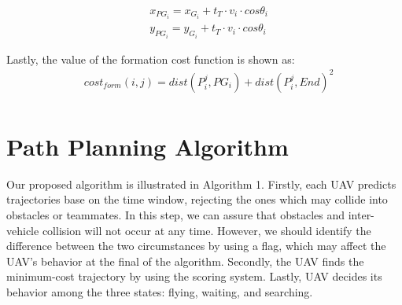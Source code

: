 \begin{equation}
\begin{aligned}
& x_{PG_{i}} = x_{G_{i}} + t_{T}\cdot v_{i}\cdot cos\theta_{i} \\
& y_{PG_{i}} = y_{G_{i}} + t_{T}\cdot v_{i}\cdot cos\theta_{i} 
\end{aligned}
\end{equation}

Lastly, the value of the formation cost function is shown as:
\begin{equation}
\begin{aligned}
& cost_{form}(i, j) = dist(P^{j}_{i}, PG_{i}) + dist(P^{j}_{i}, End)^2 \\
\end{aligned}
\end{equation}


\section{Path Planning Algorithm}
Our proposed algorithm is illustrated in Algorithm 1. Firstly, each UAV predicts trajectories base on the time window, rejecting the ones which may collide into obstacles or teammates. In this step, we can assure that obstacles and inter-vehicle collision will not occur at any time. However, we should identify the difference between the two circumstances by using a flag, which may affect the UAV's behavior at the final of the algorithm. Secondly, the UAV finds the minimum-cost trajectory by using the scoring system. Lastly, UAV decides its behavior among the three states: flying, waiting, and searching.



